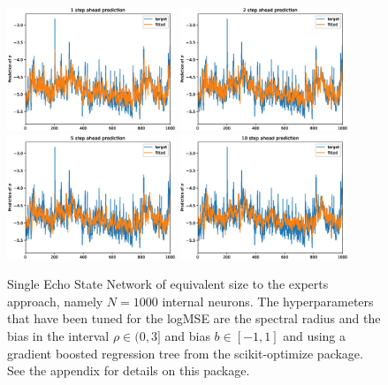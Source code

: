 \begin{figure}
    \begin{center}
        \includegraphics[width=0.45\textwidth]{Plots/Prediction/Single_logMSE_1step.eps}
        \includegraphics[width=0.45\textwidth]{Plots/Prediction/Single_logMSE_2step.eps} \\
        \includegraphics[width=0.45\textwidth]{Plots/Prediction/Single_logMSE_5step.eps}
        \includegraphics[width=0.45\textwidth]{Plots/Prediction/Single_logMSE_10step.eps}
        \label{FIG:SingleESN}
    \end{center}
    \caption{Single Echo State Network of equivalent size to the experts approach, namely $N=1000$ internal neurons. The hyperparameters that have been tuned for the logMSE are the spectral radius and the bias in the interval $\rho \in (0, 3]$ and bias $b \in [-1,1]$ and using a gradient boosted regression tree from the scikit-optimize package. See the appendix for details on this package.}
\end{figure}



